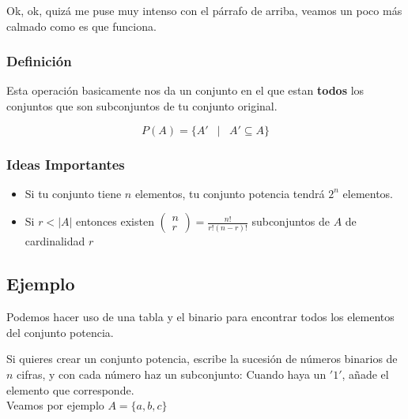 \documentclass[12pt]{report}                                    %
\DeclareMathOperator \Space {\quad}                             %
\DeclareMathOperator \MiniSpace {\;}                            %
\newcommand \Such {\MiniSpace|\MiniSpace}                       %
\newcommand{\pVector}[1]{                                       %
        \ensuremath{\begin{pmatrix}#1\end{pmatrix}}                 %
    }
\begin{document}
            Ok, ok, quizá me puse muy intenso con el párrafo de arriba, veamos un poco más calmado
            como es que funciona.

            \subsubsection*{Definición}

                Esta operación basicamente nos da un conjunto en el que estan \textbf{todos} los
                conjuntos que son subconjuntos de tu conjunto original.

                \begin{equation}
                    P(A) = \{ A' \Such A' \subseteq A \}
                \end{equation}

            \subsubsection*{Ideas Importantes}

            \begin{itemize}
                \item Si tu conjunto tiene $n$ elementos, tu conjunto potencia tendrá $2^n$ elementos.

                \item Si $r < |A|$ entonces existen $\pVector{n\\r} = \frac{n!}{r!(n-r)!}$ subconjuntos
                        de $A$ de cardinalidad $r$
            \end{itemize}

            \clearpage
            \subsection*{Ejemplo}

                Podemos hacer uso de una tabla y el binario para encontrar todos los
                elementos del conjunto potencia.

                Si quieres crear un conjunto potencia, escribe la sucesión de números binarios de $n$ cifras,
                y con cada número haz un subconjunto: Cuando haya un $'1'$, añade el elemento que corresponde.\\

                Veamos por ejemplo $A = \{a, b, c\}$ \\
\end{document}
